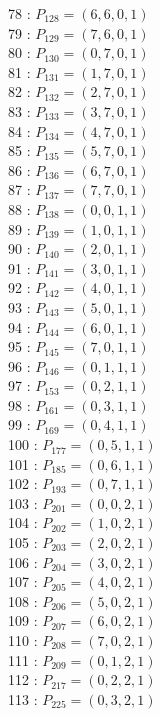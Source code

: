\documentclass{article}
\begin{document}
{\begin{multicols}{3}
78 : $P_{128}=( 6, 6, 0, 1 )$\\
79 : $P_{129}=( 7, 6, 0, 1 )$\\
80 : $P_{130}=( 0, 7, 0, 1 )$\\
81 : $P_{131}=( 1, 7, 0, 1 )$\\
82 : $P_{132}=( 2, 7, 0, 1 )$\\
83 : $P_{133}=( 3, 7, 0, 1 )$\\
84 : $P_{134}=( 4, 7, 0, 1 )$\\
85 : $P_{135}=( 5, 7, 0, 1 )$\\
86 : $P_{136}=( 6, 7, 0, 1 )$\\
87 : $P_{137}=( 7, 7, 0, 1 )$\\
88 : $P_{138}=( 0, 0, 1, 1 )$\\
89 : $P_{139}=( 1, 0, 1, 1 )$\\
90 : $P_{140}=( 2, 0, 1, 1 )$\\
91 : $P_{141}=( 3, 0, 1, 1 )$\\
92 : $P_{142}=( 4, 0, 1, 1 )$\\
93 : $P_{143}=( 5, 0, 1, 1 )$\\
94 : $P_{144}=( 6, 0, 1, 1 )$\\
95 : $P_{145}=( 7, 0, 1, 1 )$\\
96 : $P_{146}=( 0, 1, 1, 1 )$\\
97 : $P_{153}=( 0, 2, 1, 1 )$\\
98 : $P_{161}=( 0, 3, 1, 1 )$\\
99 : $P_{169}=( 0, 4, 1, 1 )$\\
100 : $P_{177}=( 0, 5, 1, 1 )$\\
101 : $P_{185}=( 0, 6, 1, 1 )$\\
102 : $P_{193}=( 0, 7, 1, 1 )$\\
103 : $P_{201}=( 0, 0, 2, 1 )$\\
104 : $P_{202}=( 1, 0, 2, 1 )$\\
105 : $P_{203}=( 2, 0, 2, 1 )$\\
106 : $P_{204}=( 3, 0, 2, 1 )$\\
107 : $P_{205}=( 4, 0, 2, 1 )$\\
108 : $P_{206}=( 5, 0, 2, 1 )$\\
109 : $P_{207}=( 6, 0, 2, 1 )$\\
110 : $P_{208}=( 7, 0, 2, 1 )$\\
111 : $P_{209}=( 0, 1, 2, 1 )$\\
112 : $P_{217}=( 0, 2, 2, 1 )$\\
113 : $P_{225}=( 0, 3, 2, 1 )$\\

\end{multicols}}
\end{document}
